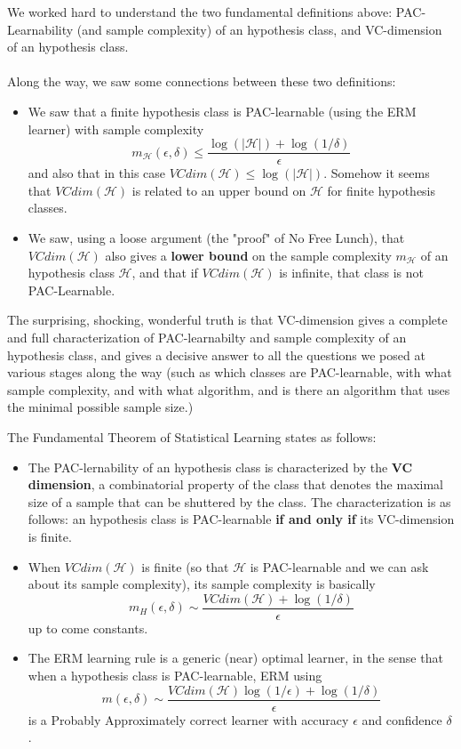 \documentclass[11pt]{article}
\newcommand{\Hc}{\mathcal{H}}
\begin{document}
We worked hard to understand the two fundamental definitions above: PAC-Learnability (and sample complexity) of an hypothesis class, and VC-dimension of an hypothesis class. 
\\~\\
Along the way, we saw some connections between these two definitions:
\begin{itemize}
    \item We saw that a finite hypothesis class is PAC-learnable (using the ERM learner)
    with sample complexity \[m_\Hc(\epsilon,\delta)\leq \frac{\log(|\Hc|) + \log(1/\delta)}{\epsilon} \]
    and also that in this case $VCdim(\Hc)\leq \log(|\Hc|)$. Somehow it seems that $VCdim(\Hc)$ is related to an upper bound on $\Hc$ for finite hypothesis classes.
    \item We saw, using a loose argument (the "proof" of No Free Lunch), that $VCdim(\Hc)$ also gives a {\bf lower bound} on the sample complexity $m_\Hc$ of an hypothesis class $\Hc$, and that if $VCdim(\Hc)$ is infinite, that class is not PAC-Learnable. 
\end{itemize}

The surprising, shocking, wonderful truth is that VC-dimension gives a complete and full characterization of PAC-learnabilty and sample complexity of an hypothesis class, and gives a decisive answer to all the questions we posed at various stages along the way (such as which classes are PAC-learnable, with what sample complexity, and with what algorithm, and is there an algorithm that uses the minimal possible sample size.)

The Fundamental Theorem of Statistical Learning states as follows:
\begin{itemize}

\item The PAC-lernability of an hypothesis class is characterized by the \textbf{VC dimension}, a combinatorial property of the class that denotes the maximal size of a sample that can be shuttered by the class.  The characterization is as follows: an hypothesis class is PAC-learnable {\bf if and only if} its VC-dimension is finite.
\item When $VCdim(\Hc)$ is finite (so that $\Hc$ is PAC-learnable and we can ask about its sample complexity), its sample complexity is basically 
\[
m_H(\epsilon,\delta) \sim \frac{VCdim(\Hc)+\log(1/\delta)}{\epsilon}
\]
up to come constants. 
\item The ERM learning rule is a generic (near) optimal learner, in the sense that when a hypothesis class is PAC-learnable, ERM using 
\[
m(\epsilon,\delta) \sim  \frac{VCdim(\Hc)\log(1/\epsilon)+\log(1/\delta)}{\epsilon}
\]
is a Probably Approximately correct learner with accuracy $\epsilon$ and confidence $\delta$.
\end{itemize}
\end{document}
